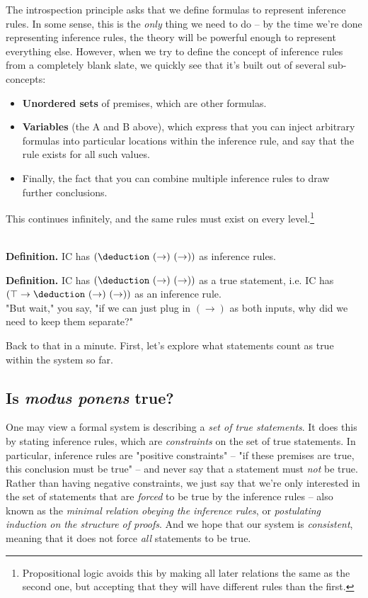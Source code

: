 \documentclass{article}
\begin{document}
  
  The introspection principle asks that we define formulas to represent inference rules.
  In some sense, this is the \emph{only} thing we need to do – by the time we're done representing inference rules, the theory will be powerful enough to represent everything else.
  However, when we try to define the concept of inference rules from a completely blank slate, we quickly see that it's built out of several sub-concepts:
  \begin{itemize}
    \item \textbf{Unordered sets} of premises, which are other formulas.
    \item \textbf{Variables} (the A and B above), which express that you can inject arbitrary formulas into particular locations within the inference rule, and say that the rule exists for all such values.
    \item Finally, the fact that you can combine multiple inference rules to draw further conclusions.
  \end{itemize}
    
  
  This continues infinitely, and the same rules must exist on every level.\footnote{Propositional logic avoids this by making all later relations the same as the second one, but accepting that they will have different rules than the first.}
  
  \\
  
  \textbf{Definition.} IC has $(\deduction\ (\to)\ (\to))$ as inference rules.
  
  \textbf{Definition.} IC has $(\deduction\ (\to)\ (\to))$ as a true statement, i.e. IC has $(\top \to \deduction\ (\to)\ (\to))$ as an inference rule.
  \\
  
  "But wait," you say, "if we can just plug in $(\to)$ as both inputs, why did we need to keep them separate?"
  
  Back to that in a minute. First, let's explore what statements count as true within the system so far.
  
  \subsection{Is \emph{modus ponens} true?}
  
  One may view a formal system is describing a \emph{set of true statements}. It does this by stating inference rules, which are \emph{constraints} on the set of true statements. In particular, inference rules are "positive constraints" – "if these premises are true, this conclusion must be true" – and never say that a statement must \emph{not} be true. Rather than having negative constraints, we just say that we're only interested in the set of statements that are \emph{forced} to be true by the inference rules – also known as the \emph{minimal relation obeying the inference rules}, or \emph{postulating induction on the structure of proofs}. And we hope that our system is \emph{consistent}, meaning that it does not force \emph{all} statements to be true.
  
\end{document}
